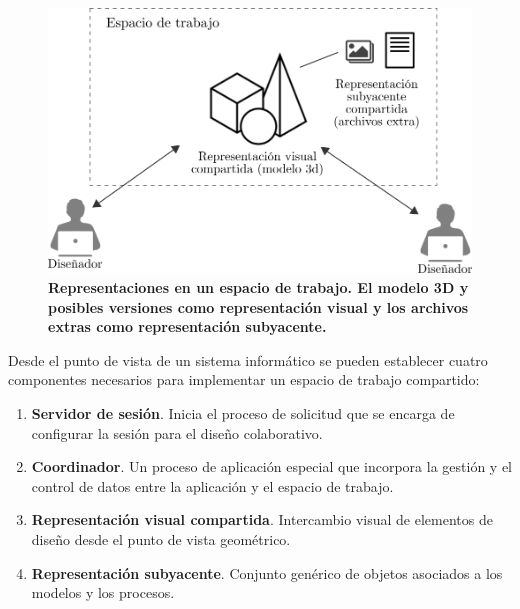 \begin{figure}[h]
\includegraphics[width=12cm]{Img/CPD/cad-shared.png}
\centering
\caption{\textbf{\footnotesize{Representaciones en un espacio de trabajo. El modelo 3D y posibles versiones como representación visual y los archivos extras como representación subyacente.}}}
\label{fig:sistemashared}
\end{figure}

Desde el punto de vista de un sistema informático se pueden establecer cuatro componentes necesarios para implementar un espacio de trabajo compartido:

\begin{enumerate}
    \item \textbf{Servidor de sesión}. Inicia el proceso de solicitud que se encarga de configurar la sesión para el diseño colaborativo.
    \item \textbf{Coordinador}. Un proceso de aplicación especial que incorpora la gestión y el control de datos entre la aplicación y el espacio de trabajo.
    \item \textbf{Representación visual compartida}. Intercambio visual de elementos de diseño desde el punto de vista geométrico.
    \item \textbf{Representación subyacente}. Conjunto genérico de objetos asociados a los modelos y los procesos.
\end{enumerate}

